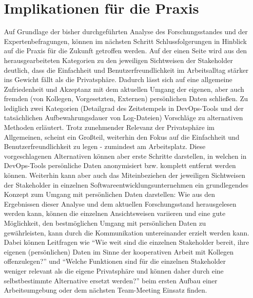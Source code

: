 \section{Implikationen für die Praxis}
Auf Grundlage der bisher durchgeführten Analyse des Forschungsstandes und der Expertenbefragungen, können im nächsten Schritt Schlussfolgerungen in Hinblick auf die Praxis für die Zukunft getroffen werden. Auf der einen Seite wird aus den herausgearbeiteten Kategorien zu den jeweiligen Sichtweisen der Stakeholder deutlich, dass die Einfachheit und Benutzerfreundlichkeit
im Arbeitsalltag stärker ins Gewicht fällt als die Privatsphäre. Dadurch lässt sich auf eine allgemeine Zufriedenheit und Akzeptanz mit dem aktuellen Umgang der eigenen, aber auch fremden (von Kollegen, Vorgesetzten, Externen) persönlichen Daten schließen. Zu lediglich zwei Kategorien (Detailgrad des Zeitstempels in DevOps-Tools und der tatsächlichen Aufbewahrungsdauer von Log-Dateien)
Vorschläge zu alternativen Methoden erläutert. Trotz zunehmender Relevanz der Privatsphäre im Allgemeinen, scheint ein Großteil, weiterhin den Fokus auf die Einfachheit und Benutzerfreundlichkeit zu legen - zumindest am Arbeitsplatz. \newline
Diese vorgeschlagenen Alternativen können aber erste Schritte darstellen, in welchen in DevOps-Tools persönliche Daten anonymisiert bzw. komplett entfernt werden können. Weiterhin kann aber auch das Miteinbeziehen der jeweiligen Sichtweisen der Stakeholder in einzelnen Softwareentwicklungsunternehmen ein grundlegendes Konzept zum Umgang mit persönlichen Daten darstellen: Wie aus den Ergebnissen dieser Analyse und dem aktuellen Forschungsstand herausgelesen
werden kann, können die einzelnen Ansichtsweisen variieren und eine gute Möglichkeit, den bestmöglichen Umgang mit persönlichen Daten zu gewährleisten, kann durch die Kommunikation untereinander erzielt werden kann. \newline Dabei können Leitfragen wie \enquote{Wie weit sind die einzelnen Stakeholder bereit, ihre eigenen (persönlichen) Daten im Sinne der kooperativen Arbeit mit Kollegen offenzulegen?} und \enquote{Welche Funktionen sind für die
einzelnen Stakeholder weniger relevant als die eigene Privatsphäre und können daher durch eine selbstbestimmte Alternative ersetzt werden?} beim ersten Aufbau einer Arbeitsumgebung oder dem nächsten Team-Meeting Einsatz finden.

